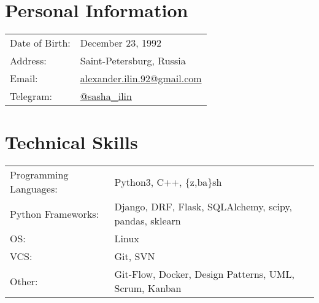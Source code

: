 \documentclass[a4paper,10pt]{article}
\begin{document}
{\par}


\section{Personal Information}
\begin{tabularx}{\textwidth}{lX}
	Date of Birth:	& December 23, 1992 \\
	Address:		& Saint-Petersburg, Russia \\
	Email:			& \href{mailto:alexander.ilin.92@gmail.com} {alexander.ilin.92@gmail.com} \\
	Telegram:		& \href{https://t.me/sasha_ilin} {@sasha\_ilin} \\
\end{tabularx}


\section{Technical Skills}
\begin{tabular}{ll}
	Programming Languages:	& Python3, C++, \{z,ba\}sh \\
	Python Frameworks:		& Django, DRF, Flask, SQLAlchemy, scipy, pandas, sklearn \\
	OS:						& Linux \\
	VCS:					& Git, SVN \\
	Other:					& Git-Flow, Docker, Design Patterns, UML, Scrum, Kanban
\end{tabular}


\end{document}
